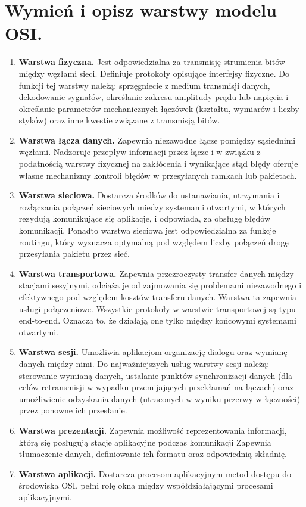 \documentclass[12pt,a4paper]{article}
\begin{document}
	\section{Wymień i opisz warstwy modelu OSI.}
	\begin{enumerate}
	\item \textbf{Warstwa fizyczna.} Jest odpowiedzialna za transmisję strumienia bitów między węzłami sieci. Definiuje protokoły opisujące interfejsy fizyczne. Do funkcji tej warstwy należą: sprzęgniecie z medium transmisji danych, dekodowanie sygnałów, określanie zakresu amplitudy prądu lub napięcia i określanie parametrów mechanicznych łączówek (kształtu, wymiarów i liczby styków) oraz inne kwestie związane z transmisją bitów. 
	\item \textbf{Warstwa łącza danych.} Zapewnia niezawodne łącze pomiędzy sąsiednimi węzłami. Nadzoruje przepływ informacji przez łącze i w związku z podatnością warstwy fizycznej na zakłócenia i wynikające stąd błędy oferuje własne mechanizmy kontroli błędów w przesyłanych ramkach lub pakietach.
	\item \textbf{Warstwa sieciowa.} Dostarcza środków do ustanawiania, utrzymania i rozłączania połączeń sieciowych miedzy systemami otwartymi, w których rezydują komunikujące się aplikacje, i odpowiada, za obsługę błędów komunikacji. Ponadto warstwa sieciowa jest odpowiedzialna za funkcje routingu, który wyznacza optymalną pod względem liczby połączeń drogę przesyłania pakietu przez sieć.
	\item \textbf{Warstwa transportowa.} Zapewnia przezroczysty transfer danych między stacjami sesyjnymi, odciąża je od zajmowania się problemami niezawodnego i efektywnego pod względem kosztów transferu danych. Warstwa ta zapewnia usługi połączeniowe. Wszystkie protokoły w warstwie transportowej są typu end-to-end. Oznacza to, że działają one tylko między końcowymi systemami otwartymi.
	\item \textbf{Warstwa sesji.} Umożliwia aplikacjom organizację dialogu oraz wymianę danych między nimi. Do najważniejszych usług warstwy sesji należą: sterowanie wymianą danych, ustalanie punktów synchronizacji danych (dla celów retransmisji w wypadku przemijających przekłamań na łączach) oraz umożliwienie odzyskania danych (utraconych w wyniku przerwy w łączności) przez ponowne ich przesłanie.
	\item \textbf{Warstwa prezentacji.} Zapewnia możliwość reprezentowania informacji, którą się posługują stacje aplikacyjne podczas komunikacji Zapewnia tłumaczenie danych, definiowanie ich formatu oraz odpowiednią składnię.
	\item \textbf{Warstwa aplikacji.} Dostarcza procesom aplikacyjnym metod dostępu do środowiska OSI, pełni rolę okna między współdziałającymi procesami aplikacyjnymi.
	\end{enumerate}
\end{document}
